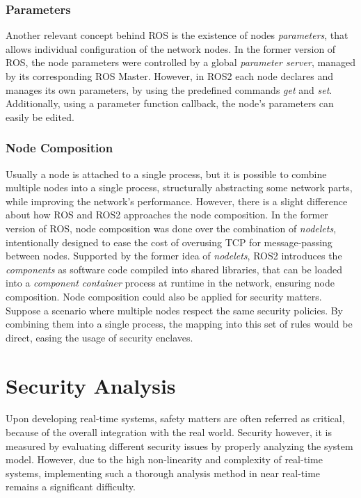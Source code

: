 \subsubsection{Parameters}   

Another relevant concept behind ROS is the existence of nodes \textit{parameters}, that allows individual configuration of the network nodes. In the former version of ROS, the node parameters were controlled by a global \textit{parameter server}, managed by its corresponding ROS Master. However, in ROS2 each node declares and manages its own parameters, by using the predefined commands \textit{get} and \textit{set}. Additionally, using a parameter function callback, the node's parameters can easily be edited.
        

\subsubsection{Node Composition}  

Usually a node is attached to a single process, but it is possible to combine multiple nodes into a single process, structurally abstracting some network parts, while improving the network's performance. However, there is a slight difference about how ROS and ROS2 approaches the node composition. In the former version of ROS, node composition was done over the combination of \textit{nodelets}, intentionally designed to ease the cost of overusing TCP for message-passing between nodes. Supported by the former idea of \textit{nodelets}, ROS2 introduces the \textit{components} as software code compiled into shared libraries, that can be loaded into a \textit{component container} process at runtime in the network, ensuring node composition. Node composition could also be applied for security matters. Suppose a scenario where multiple nodes respect the same security policies. By combining them into a single process, the mapping into this set of rules would be direct, easing the usage of security enclaves.
               

\section{Security Analysis}

Upon developing real-time systems, safety matters are often referred as critical, because of the overall integration with the real world. Security however, it is measured by evaluating different security issues by properly analyzing the system model. However, due to the high non-linearity and complexity of real-time systems, implementing such a thorough analysis method in near real-time remains a significant difficulty. \cite{diao2009design}


